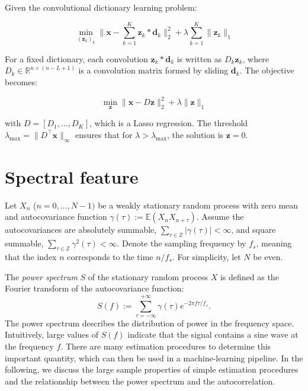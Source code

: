 \documentclass[11pt]{article}
\begin{document}
\begin{solution}  %

Given the convolutional dictionary learning problem:

\[
\min_{(\mathbf{z}_k)_k} \|\mathbf{x} - \sum_{k=1}^K \mathbf{z}_k * \mathbf{d}_k\|_2^2 + \lambda \sum_{k=1}^K \|\mathbf{z}_k\|_1
\]

For a fixed dictionary, each convolution \(\mathbf{z}_k * \mathbf{d}_k\) is written as \(D_k \mathbf{z}_k\), where \(D_k \in \mathbb{R}^{n \times (n-L+1)}\) is a convolution matrix formed by sliding \(\mathbf{d}_k\). The objective becomes:

\[
\min_{\mathbf{z}} \|\mathbf{x} - D \mathbf{z}\|_2^2 + \lambda \|\mathbf{z}\|_1
\]

with \(D = [D_1, \dots, D_K]\), which is a Lasso regression. The threshold \(\lambda_{\max} = \|D^\top \mathbf{x}\|_\infty\) ensures that for \(\lambda > \lambda_{\max}\), the solution is \(\mathbf{z} = 0\).

\end{solution}

\section{Spectral feature}

Let $X_n$ ($n=0,\dots, N-1)$ be a weakly stationary random process with zero mean and autocovariance function $\gamma(\tau):= \mathbb{E}(X_n X_{n+\tau})$.
Assume the autocovariances are absolutely summable, \ie $\sum_{\tau\in\mathbb{Z}} |\gamma(\tau)| < \infty$, and square summable, \ie $\sum_{\tau\in\mathbb{Z}} \gamma^2(\tau) < \infty$.
Denote the sampling frequency by $f_s$, meaning that the index $n$ corresponds to the time $n / f_s$. For simplicity, let $N$ be even.


The \textit{power spectrum} $S$ of the stationary random process $X$ is defined as the Fourier transform of the autocovariance function:
\begin{equation}
    S(f) := \sum_{\tau=-\infty}^{+\infty}\gamma(\tau)e^{-2\pi f\tau/f_s}.
\end{equation}
The power spectrum describes the distribution of power in the frequency space. 
Intuitively, large values of $S(f)$ indicate that the signal contains a sine wave at the frequency $f$.
There are many estimation procedures to determine this important quantity, which can then be used in a machine-learning pipeline.
In the following, we discuss the large sample properties of simple estimation procedures and the relationship between the power spectrum and the autocorrelation.
\end{document}
